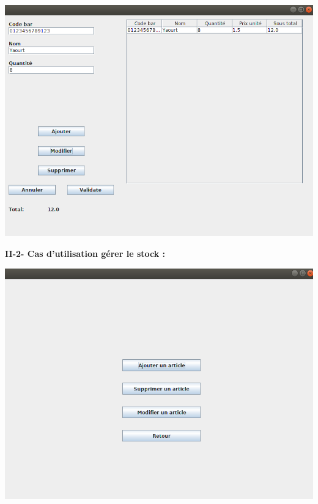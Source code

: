 \documentclass[french,10pt,a4paper]{report}
\begin{document}
\begin{center}
	\includegraphics[scale=0.4]{captures/3_swing.png}
\end{center}
\textbf{II-2- Cas d'utilisation gérer le stock :}
\begin{center}
	\includegraphics[scale=0.4]{captures/4_swing.png}
\end{center}
\end{document}
